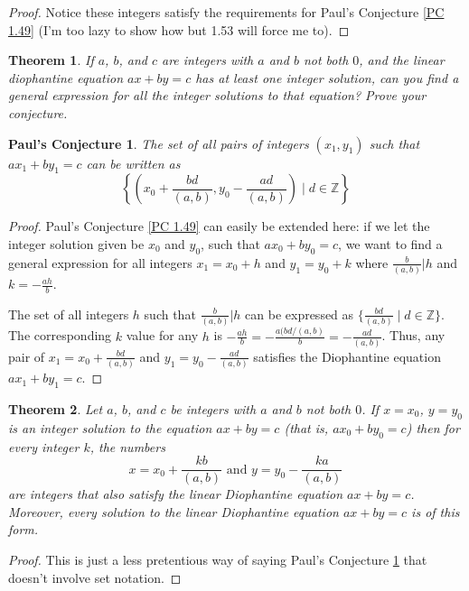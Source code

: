 \documentclass{article}
\newtheorem{thm}{Theorem}[section]
\newtheorem{PC}{Paul's Conjecture}
\numberwithin{equation}{thm}
\begin{document}
\begin{proof}
  Notice these integers satisfy the requirements for Paul's Conjecture \ref{PC 1.49} (I'm too lazy to show how but 1.53 will force me to).
\end{proof}



\begin{thm} \label{1.52}
  If $a$, $b$, and $c$ are integers with $a$ and $b$ not both $0$, and the linear diophantine equation $ax + by = c$ has at least one integer solution, can you find a general expression for all the integer solutions to that equation? Prove your conjecture.
\end{thm}

\begin{PC} \label{PC 1.52}
  The set of all pairs of integers $(x_1, y_1)$ such that $ax_1 + by_1 = c$ can be written as $$\left\{ \left(x_0 + \frac{bd}{(a,b)}, y_0 - \frac{ad}{(a,b)} \right) \mid d \in \mathbb{Z} \right\}$$
\end{PC}

\begin{proof}
Paul's Conjecture \ref{PC 1.49} can easily be extended here: if we let the integer solution given be $x_0$ and $y_0$, such that $ax_0 + by_0 = c$, we want to find a general expression for all integers $x_1 = x_0 + h$ and $y_1 = y_0 + k$ where $\frac{b}{(a,b)} | h$ and $k = - \frac{ah}{b}$.

The set of all integers $h$ such that $\frac{b}{(a,b)} | h$ can be expressed as $\{\frac{bd}{(a,b)} \mid d \in \mathbb{Z}\}$. The corresponding $k$ value for any $h$ is $- \frac{ah}{b} = - \frac{a (bd / (a,b)}{b} = - \frac{ad}{(a,b)}$.
Thus, any pair of $x_1 = x_0 + \frac{bd}{(a, b)}$ and $y_1 = y_0 - \frac{ad}{(a,b)}$ satisfies the Diophantine equation $ax_1 + by_1 = c$.
\end{proof}



\begin{thm} \label{1.53}
  Let $a$, $b$, and $c$ be integers with $a$ and $b$ not both $0$. If $x = x_0$, $y = y_0$ is an integer solution to the equation $ax + by = c$ (that is, $ax_0 + by_0 = c$) then for every integer $k$, the numbers
  $$x = x_0 + \frac{kb}{(a,b)} \mbox{ and } y = y_0 - \frac{ka}{(a,b)}$$
  are integers that also satisfy the linear Diophantine equation $ax + by = c$. Moreover, every solution to the linear Diophantine equation $ax + by = c$ is of this form.
\end{thm}

\begin{proof}
  This is just a less pretentious way of saying Paul's Conjecture \ref{PC 1.52} that doesn't involve set notation.
\end{proof}
\end{document}
